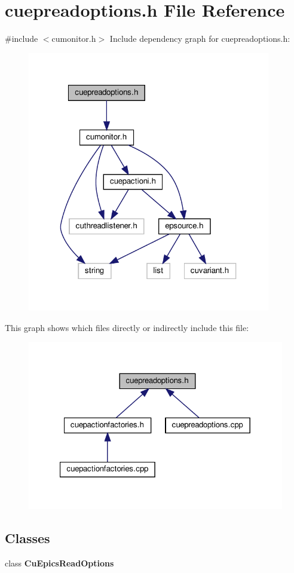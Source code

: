 \section{cuepreadoptions.\+h File Reference}
\label{cuepreadoptions_8h}
{\ttfamily \#include $<$cumonitor.\+h$>$}\newline
Include dependency graph for cuepreadoptions.\+h\+:\nopagebreak
\begin{figure}[H]
\begin{center}
\leavevmode
\includegraphics[width=301pt]{cuepreadoptions_8h__incl}
\end{center}
\end{figure}
This graph shows which files directly or indirectly include this file\+:\nopagebreak
\begin{figure}[H]
\begin{center}
\leavevmode
\includegraphics[width=321pt]{cuepreadoptions_8h__dep__incl}
\end{center}
\end{figure}
\subsection*{Classes}
\begin{DoxyCompactItemize}
\item 
class \textbf{ Cu\+Epics\+Read\+Options}
\end{DoxyCompactItemize}
